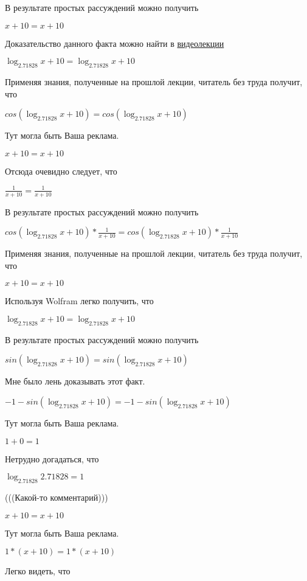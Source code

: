 \documentclass[12pt,a4paper,fleqn]{article}
\theoremstyle{definition}
\begin{document}
В результате простых рассуждений можно получить 

$ x  +  10  =  x  +  10 $

Доказательство данного факта можно найти в \href{https://www.youtube.com/watch?v=dQw4w9WgXcQ}{видеолекции} 

$\log_{ 2.71828 }{ x  +  10 } = \log_{ 2.71828 }{ x  +  10 }$

Применяя знания, полученные на прошлой лекции, читатель без труда получит, что 

$cos(\log_{ 2.71828 }{ x  +  10 }) = cos(\log_{ 2.71828 }{ x  +  10 })$

Тут могла быть Ваша реклама. 

$ x  +  10  =  x  +  10 $

Отсюда очевидно следует, что 

$\frac{ 1 }{ x  +  10 }
 = \frac{ 1 }{ x  +  10 }
$

В результате простых рассуждений можно получить 

$cos(\log_{ 2.71828 }{ x  +  10 }) * \frac{ 1 }{ x  +  10 }
 = cos(\log_{ 2.71828 }{ x  +  10 }) * \frac{ 1 }{ x  +  10 }
$

Применяя знания, полученные на прошлой лекции, читатель без труда получит, что 

$ x  +  10  =  x  +  10 $

Используя Wolfram легко получить, что 

$\log_{ 2.71828 }{ x  +  10 } = \log_{ 2.71828 }{ x  +  10 }$

В результате простых рассуждений можно получить 

$sin(\log_{ 2.71828 }{ x  +  10 }) = sin(\log_{ 2.71828 }{ x  +  10 })$

Мне было лень доказывать этот факт.

$ -1  - sin(\log_{ 2.71828 }{ x  +  10 }) =  -1  - sin(\log_{ 2.71828 }{ x  +  10 })$

Тут могла быть Ваша реклама. 

$ 1  +  0  =  1 $

Нетрудно догадаться, что 

$\log_{ 2.71828 }{ 2.71828 } =  1 $

(((Какой-то комментарий))) 

$ x  +  10  =  x  +  10 $

Тут могла быть Ваша реклама. 

$ 1  * ( x  +  10 ) =  1  * ( x  +  10 )$

Легко видеть, что 
\end{document}
